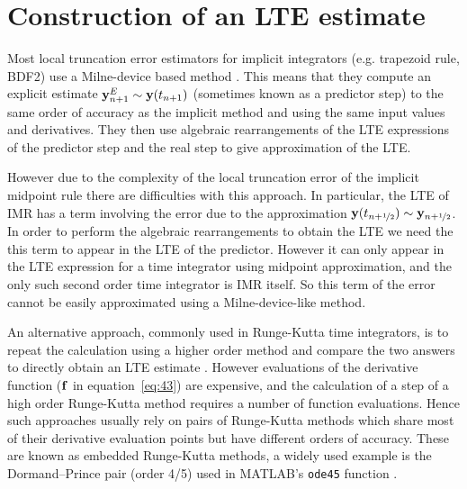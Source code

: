 \section{Construction of an LTE estimate}

Most local truncation error estimators for implicit integrators (e.g. trapezoid rule, BDF2) use a Milne-device based method \cite[707-716]{GreshoSani}.
This means that they compute an explicit estimate $\mathbf{y}^E_{n+1} \sim \mathbf{y}(t_{n+1})$  (sometimes known as a predictor step) to the same order of accuracy as the implicit method and using the same input values and derivatives.
They then use algebraic rearrangements of the LTE expressions of the predictor step and the real step to give approximation of the LTE.

However due to the complexity of the local truncation error of the implicit midpoint rule there are difficulties with this approach.
In particular, the LTE of IMR has a term involving the error due to the approximation $\mathbf{y}(t_{n+\nicefrac{1}{2}}) \sim \mathbf{y}_{n+\nicefrac{1}{2}}$.
In order to perform the algebraic rearrangements to obtain the LTE we need the this term to appear in the LTE of the predictor.
However it can only appear in the LTE expression for a time integrator using midpoint approximation, and the only such second order time integrator is IMR itself.
So this term of the error cannot be easily approximated using a Milne-device-like method.

An alternative approach, commonly used in Runge-Kutta time integrators, is to repeat the calculation using a higher order method and compare the two answers to directly obtain an LTE estimate \cite[165]{HairerWanner}.
However evaluations of the derivative function (${\mathbf{f}}$ in equation~\eqref{eq:43}) are expensive, and the calculation of a step of a high order Runge-Kutta method requires a number of function evaluations.
Hence such approaches usually rely on pairs of Runge-Kutta methods which share most of their derivative evaluation points but have different orders of accuracy.
These are known as embedded Runge-Kutta methods, a widely used example is the Dormand–Prince pair (order 4/5) used in MATLAB's \texttt{ode45} function \cite{matlab-ode45}.


